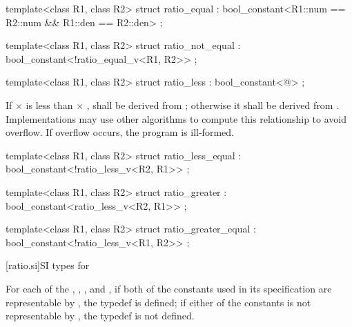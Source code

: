 %
\begin{itemdecl}
template<class R1, class R2>
  struct ratio_equal : bool_constant<R1::num == R2::num && R1::den == R2::den> { };
\end{itemdecl}

%
\begin{itemdecl}
template<class R1, class R2>
  struct ratio_not_equal : bool_constant<!ratio_equal_v<R1, R2>> { };
\end{itemdecl}

%
\begin{itemdecl}
template<class R1, class R2>
  struct ratio_less : bool_constant<@\seebelow@> { };
\end{itemdecl}

\begin{itemdescr}
\pnum
If  $\times$  is less than  $\times$ ,
 shall be
derived from ; otherwise it shall be derived from
. Implementations may use other algorithms to
compute this relationship to avoid overflow. If overflow occurs, the program is ill-formed.
\end{itemdescr}

%
\begin{itemdecl}
template<class R1, class R2>
  struct ratio_less_equal : bool_constant<!ratio_less_v<R2, R1>> { };
\end{itemdecl}

%
\begin{itemdecl}
template<class R1, class R2>
  struct ratio_greater : bool_constant<ratio_less_v<R2, R1>> { };
\end{itemdecl}

%
\begin{itemdecl}
template<class R1, class R2>
  struct ratio_greater_equal : bool_constant<!ratio_less_v<R1, R2>> { };
\end{itemdecl}

[ratio.si]{SI types for }

\pnum
For each of the  , ,
, and , if both of the constants used in its
specification are representable by , the typedef is
defined; if either of the constants is not representable by ,
the typedef is not defined.

